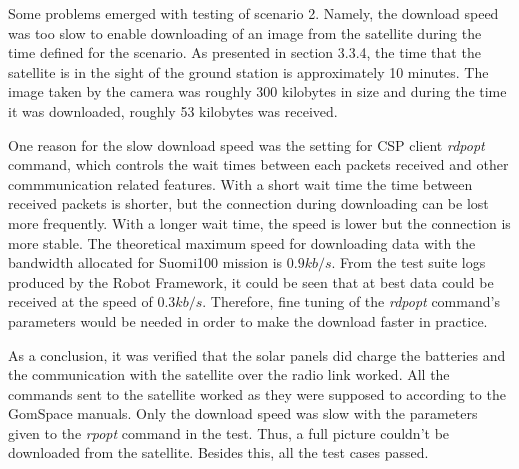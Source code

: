 \documentclass[english,12pt,a4paper,pdftex,elec,utf8]{aaltothesis}
\begin{document}
Some problems emerged with testing of scenario 2. Namely, the download speed was too slow to enable downloading of an image from the satellite during the time defined for the scenario. As presented in section 3.3.4, the time that the satellite is in the sight of the ground station is approximately 10 minutes. The image taken by the camera was roughly 300 kilobytes in size and during the time it was downloaded, roughly 53 kilobytes was received.\par 
One reason for the slow download speed was the setting for CSP client \textit{rdpopt} command, which controls the wait times between each packets received and other commmunication related features. With a short wait time the time between received packets is shorter, but the connection during downloading can be lost more frequently. With a longer wait time, the speed is lower but the connection is more stable. The theoretical maximum speed for downloading data with the bandwidth allocated for Suomi100 mission is $0.9 kb/s$. From the test suite logs produced by the Robot Framework, it could be seen that at best data could be received at the speed of $0.3 kb/s$. Therefore, fine tuning of the \textit{rdpopt} command's parameters would be needed in order to make the download faster in practice.\par
As a conclusion, it was verified that the solar panels did charge the batteries and the communication with the satellite over the radio link worked. All the commands sent to the satellite worked as they were supposed to according to the GomSpace manuals. Only the download speed was slow with the parameters given to the \textit{rpopt} command in the test. Thus, a full picture couldn't be downloaded from the satellite. Besides this, all the test cases passed.\par      
\end{document}
